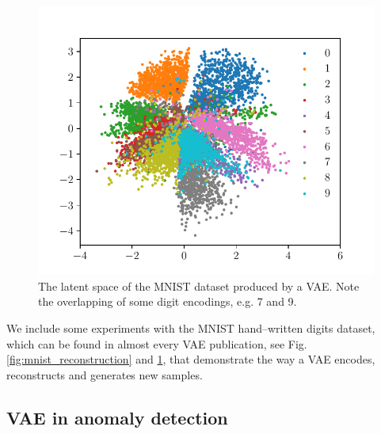 \begin{figure}
\begin{centering}
\includegraphics[scale=0.8]{data/chapter_survey/mnist_latent}
\par\end{centering}
\caption{The latent space of the MNIST dataset produced by a VAE. Note the
overlapping of some digit encodings, e.g. 7 and 9.}
\label{fig:mnist_latent}
\end{figure}

We include some experiments with the MNIST hand--written digits dataset,
which can be found in almost every VAE publication, see Fig.\,\ref{fig:mnist_reconstruction}
and \ref{fig:mnist_latent}, that demonstrate the way a VAE encodes,
reconstructs and generates new samples.

\subsection{VAE in anomaly detection}

